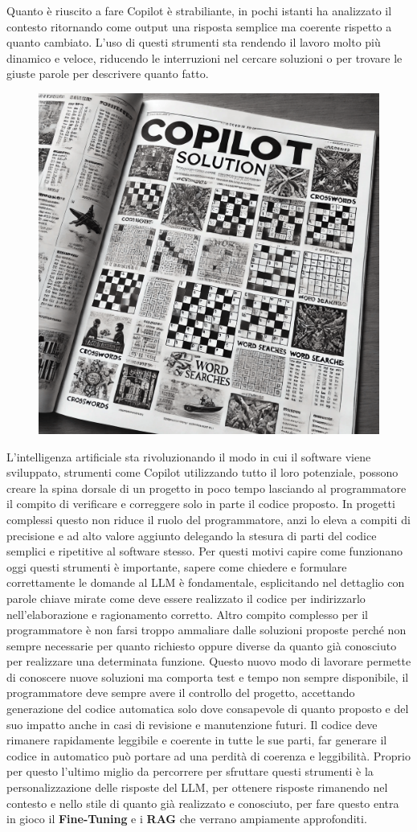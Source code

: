 \documentclass[12pt,a4paper,openright,twoside]{book}
\begin{document}
Quanto è riuscito a fare Copilot è strabiliante, in pochi istanti ha analizzato il contesto ritornando come output una risposta semplice ma coerente rispetto a quanto cambiato.
L'uso di questi strumenti sta rendendo il lavoro molto più dinamico e veloce, riducendo le interruzioni nel cercare soluzioni o per trovare le giuste parole per descrivere
quanto fatto.
\begin{figure}[h]
    \centering
    \includegraphics[width=0.5\linewidth]{figures/copilotsolutionSettimanaEnigmistica.png}
    \label{fig:Copilot-Solution}
\end{figure}
\newline
L'intelligenza artificiale sta rivoluzionando il modo in cui il software viene sviluppato, strumenti come Copilot utilizzando tutto il loro potenziale, possono creare la spina dorsale di un progetto
in poco tempo lasciando al programmatore il compito di verificare e correggere solo in parte il codice proposto. 
In progetti complessi questo non riduce il ruolo del programmatore, anzi lo eleva a compiti di precisione e ad alto valore aggiunto delegando la stesura di parti del codice semplici e ripetitive al software stesso.
Per questi motivi capire come funzionano oggi questi strumenti è importante, sapere come chiedere e formulare correttamente le domande al LLM è fondamentale, esplicitando nel dettaglio con parole chiave mirate come deve essere realizzato il codice per indirizzarlo nell'elaborazione e ragionamento corretto.
Altro compito complesso per il programmatore è non farsi troppo ammaliare dalle soluzioni proposte perché non sempre necessarie per quanto richiesto oppure diverse da quanto già conosciuto
 per realizzare una determinata funzione.
Questo nuovo modo di lavorare permette di conoscere nuove soluzioni ma comporta test e tempo non sempre disponibile,
il programmatore deve sempre avere il controllo del progetto, accettando generazione del codice automatica solo dove consapevole di quanto proposto e del suo impatto anche in casi di revisione e manutenzione futuri.
Il codice deve rimanere rapidamente leggibile e coerente in tutte le sue parti, far generare il codice in automatico può portare ad una perdità di coerenza e leggibilità. 
Proprio per questo l'ultimo miglio da percorrere per sfruttare questi strumenti è la personalizzazione delle risposte del LLM, per ottenere risposte rimanendo nel contesto e nello stile di quanto già realizzato e conosciuto, per fare questo entra in gioco il \textbf{Fine-Tuning} e i \textbf{RAG} che verrano ampiamente approfonditi.
\end{document}
